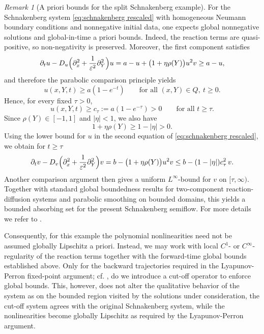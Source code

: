 \documentclass[11pt]{article}
\theoremstyle{definition}
\theoremstyle{remark}
\newtheorem{remark}[theorem]{Remark}
\numberwithin{equation}{section}
\begin{document}
\begin{remark}[A priori bounds for the split Schnakenberg example]
For the Schnakenberg system \eqref{eq:schnakenberg rescaled} with homogeneous Neumann boundary conditions and nonnegative initial data, one expects global nonnegative solutions and global-in-time a priori bounds. 
Indeed, the reaction terms are quasi-positive, so non-negativity is preserved.
Moreover, the first component satisfies
\[
\partial_t u - D_u\Bigl(\partial_x^2 + \frac{1}{\varepsilon^2}\partial_Y^2\Bigr)u
= a-u+\bigl(1+\eta\rho(Y)\bigr)u^2v \ge a-u,
\]
and therefore the parabolic comparison principle yields
\[
u(x,Y,t)\ge a(1-e^{-t}) \qquad \text{for all } (x,Y)\in Q,\ t\ge 0.
\]
Hence, for every fixed $\tau>0$,
\[
u(x,Y,t)\ge c_\tau:=a(1-e^{-\tau})>0 \qquad \text{for all } t\ge \tau.
\]
Since $\rho(Y)\in[-1,1]$ and $|\eta|<1$, we also have
\[
1+\eta\rho(Y)\ge 1-|\eta|>0.
\]
Using the lower bound for $u$ in the second equation of \eqref{eq:schnakenberg rescaled}, we obtain for $t\ge \tau$
\[
\partial_t v - D_v\Bigl(\partial_x^2 + \frac{1}{\varepsilon^2}\partial_Y^2\Bigr)v
= b-\bigl(1+\eta\rho(Y)\bigr)u^2v
\le b-(1-|\eta|)c_\tau^2\,v.
\]
Another comparison argument then gives a uniform $L^\infty$-bound for $v$ on $[\tau,\infty)$.
Together with standard global boundedness results for two-component reaction-diffusion systems and parabolic smoothing on bounded domains, this yields a bounded absorbing set for the present Schnakenberg semiflow.
For more details we refer to \cite{hollis1987global, pierre2010global}.

Consequently, for this example the polynomial nonlinearities need not be assumed globally Lipschitz a priori. 
Instead, we may work with local $C^1$- or $C^\infty$-regularity of the reaction terms together with the forward-time global bounds established above.
Only for the backward trajectories required in the Lyapunov-Perron fixed-point argument; cf. , do we introduce a cut-off operator to enforce global bounds.
This, however, does not alter the qualitative behavior of the system as on the bounded region visited
by the solutions under consideration, the cut-off system agrees with the original Schnakenberg system, while the nonlinearities become globally Lipschitz as required by the Lyapunov-Perron argument.

\end{remark}
\end{document}
